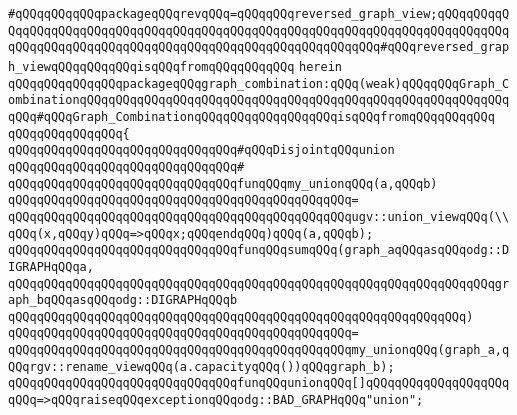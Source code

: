 \verb|#qQQqqQQqqQQqpackageqQQqrevqQQq=qQQqqQQqreversed_graph_view;qQQqqQQqqQQqqQQqqQQqqQQqqQQqqQQqqQQqqQQqqQQqqQQqqQQqqQQqqQQqqQQqqQQqqQQqqQQqqQQqqQQqqQQqqQQqqQQqqQQqqQQqqQQqqQQqqQQqqQQqqQQqqQQqqQQq#qQQqreversed_graph_viewqQQqqQQqqQQqisqQQqfromqQQqqQQqqQQq|\newline
\verb|herein|\newline
\newline
\verb|qQQqqQQqqQQqqQQqpackageqQQqgraph_combination:qQQq(weak)qQQqqQQqGraph_CombinationqQQqqQQqqQQqqQQqqQQqqQQqqQQqqQQqqQQqqQQqqQQqqQQqqQQqqQQqqQQqqQQq#qQQqGraph_CombinationqQQqqQQqqQQqqQQqqQQqisqQQqfromqQQqqQQqqQQq|\newline
\verb|qQQqqQQqqQQqqQQq{|\newline
\newline
\newline
\verb|qQQqqQQqqQQqqQQqqQQqqQQqqQQqqQQq#qQQqDisjointqQQqunion|\newline
\verb|qQQqqQQqqQQqqQQqqQQqqQQqqQQqqQQq#|\newline
\verb|qQQqqQQqqQQqqQQqqQQqqQQqqQQqqQQqfunqQQqmy_unionqQQq(a,qQQqb)|\newline
\verb|qQQqqQQqqQQqqQQqqQQqqQQqqQQqqQQqqQQqqQQqqQQqqQQq=|\newline
\verb|qQQqqQQqqQQqqQQqqQQqqQQqqQQqqQQqqQQqqQQqqQQqqQQqugv::union_viewqQQq(\\qQQq(x,qQQqy)qQQq=>qQQqx;qQQqendqQQq)qQQq(a,qQQqb);|\newline
\newline
\newline
\verb|qQQqqQQqqQQqqQQqqQQqqQQqqQQqqQQqfunqQQqsumqQQq(graph_aqQQqasqQQqodg::DIGRAPHqQQqa,|\newline
\verb|qQQqqQQqqQQqqQQqqQQqqQQqqQQqqQQqqQQqqQQqqQQqqQQqqQQqqQQqqQQqqQQqqQQqgraph_bqQQqasqQQqodg::DIGRAPHqQQqb|\newline
\verb|qQQqqQQqqQQqqQQqqQQqqQQqqQQqqQQqqQQqqQQqqQQqqQQqqQQqqQQqqQQqqQQq)|\newline
\verb|qQQqqQQqqQQqqQQqqQQqqQQqqQQqqQQqqQQqqQQqqQQqqQQq=|\newline
\verb|qQQqqQQqqQQqqQQqqQQqqQQqqQQqqQQqqQQqqQQqqQQqqQQqmy_unionqQQq(graph_a,qQQqrgv::rename_viewqQQq(a.capacityqQQq())qQQqgraph_b);|\newline
\newline
\verb|qQQqqQQqqQQqqQQqqQQqqQQqqQQqqQQqfunqQQqunionqQQq[]qQQqqQQqqQQqqQQqqQQqqQQq=>qQQqraiseqQQqexceptionqQQqodg::BAD_GRAPHqQQq"union";|\newline
